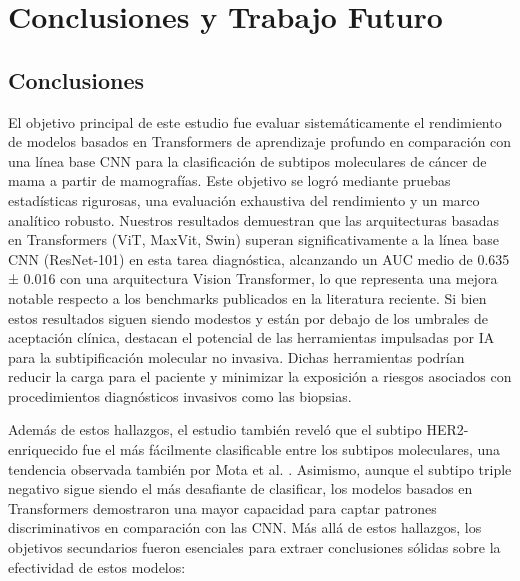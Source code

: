 \documentclass[a4paper,10pt]{book}
\begin{document}
\chapter{Conclusiones y Trabajo Futuro}

\section{Conclusiones}

El objetivo principal de este estudio fue evaluar sistemáticamente el rendimiento de modelos basados en Transformers de aprendizaje profundo en comparación con una línea base CNN para la clasificación de subtipos moleculares de cáncer de mama a partir de mamografías. Este objetivo se logró mediante pruebas estadísticas rigurosas, una evaluación exhaustiva del rendimiento y un marco analítico robusto. Nuestros resultados demuestran que las arquitecturas basadas en Transformers (ViT, MaxVit, Swin) superan significativamente a la línea base CNN (ResNet-101) en esta tarea diagnóstica, alcanzando un AUC medio de 0.635 ± 0.016 con una arquitectura Vision Transformer, lo que representa una mejora notable respecto a los benchmarks publicados en la literatura reciente. Si bien estos resultados siguen siendo modestos y están por debajo de los umbrales de aceptación clínica, destacan el potencial de las herramientas impulsadas por IA para la subtipificación molecular no invasiva. Dichas herramientas podrían reducir la carga para el paciente y minimizar la exposición a riesgos asociados con procedimientos diagnósticos invasivos como las biopsias.

Además de estos hallazgos, el estudio también reveló que el subtipo HER2-enriquecido fue el más fácilmente clasificable entre los subtipos moleculares, una tendencia observada también por Mota et al. \cite{mota_breast_2024}. Asimismo, aunque el subtipo triple negativo sigue siendo el más desafiante de clasificar, los modelos basados en Transformers demostraron una mayor capacidad para captar patrones discriminativos en comparación con las CNN. Más allá de estos hallazgos, los objetivos secundarios fueron esenciales para extraer conclusiones sólidas sobre la efectividad de estos modelos:
\end{document}
